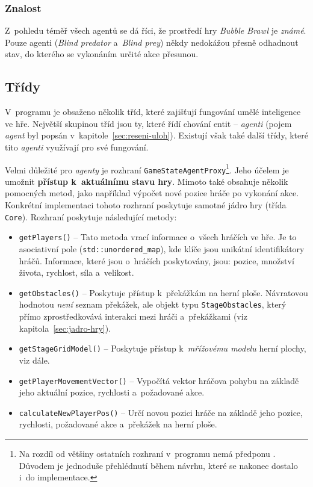 \subsubsection*{Znalost}

Z~pohledu téměř všech agentů se dá říci, že prostředí hry \emph{Bubble Brawl} je \emph{známé}. Pouze  agenti (\emph{Blind predator} a~\emph{Blind prey}) někdy nedokážou přesně odhadnout stav, do kterého se vykonáním určité akce přesunou.

\subsection{Třídy}
\label{sec:entity-rizene-pocitacem:tridy}

V~programu je obsaženo několik tříd, které zajišťují fungování umělé inteligence ve hře. Největší skupinou tříd jsou ty, které řídí chování entit -- \emph{agenti} (pojem \emph{agent} byl popsán v~kapitole~\ref{sec:reseni-uloh}). Existují však také další třídy, které tito \emph{agenti} využívají pro své fungování.

Velmi důležité pro \emph{agenty} je rozhraní \texttt{GameStateAgentProxy}\footnote{Na rozdíl od většiny ostatních rozhraní v~programu nemá předponu . Důvodem je jednoduše přehlédnutí během návrhu, které se nakonec dostalo i~do implementace.}. Jeho účelem je umožnit \textbf{přístup k~aktuálnímu stavu hry}. Mimoto také obsahuje několik pomocných metod, jako například výpočet nové pozice hráče po vykonání akce. Konkrétní implementaci tohoto rozhraní poskytuje samotné jádro hry (třída \texttt{Core}). Rozhraní poskytuje následující metody:
\begin{itemize}
    \item \texttt{getPlayers()} -- Tato metoda vrací informace o~všech hráčích ve hře. Je to asociativní pole (\texttt{std::unordered\_map}), kde klíče jsou unikátní identifikátory hráčů. Informace, které jsou o~hráčích poskytovány, jsou: pozice, množství života, rychlost, síla a~velikost.
    \item \texttt{getObstacles()} -- Poskytuje přístup k~překážkám na herní ploše. Návratovou hodnotou \emph{není} seznam překážek, ale objekt typu \texttt{StageObstacles}, který přímo zprostředkovává interakci mezi hráči a~překážkami (viz kapitola~\ref{sec:jadro-hry}).
    \item \texttt{getStageGridModel()} -- Poskytuje přístup k~\emph{mřížovému modelu} herní plochy, viz dále.
    \item \texttt{getPlayerMovementVector()} -- Vypočítá vektor hráčova pohybu na základě jeho aktuální pozice, rychlosti a~požadované akce.
    \item \texttt{calculateNewPlayerPos()} -- Určí novou pozici hráče na základě jeho pozice, rychlosti, požadované akce a~překážek na herní ploše.
\end{itemize}


